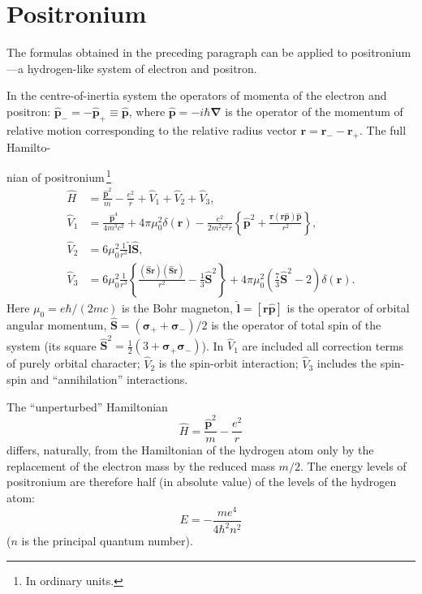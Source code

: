 \section{Positronium}

The formulas obtained in the preceding paragraph can be applied to positronium---a hydrogen-like system of electron and positron.

In the centre-of-inertia system the operators of momenta of the electron and positron: $\hat{\mathbf{p}}_- = -\hat{\mathbf{p}}_+ \equiv \hat{\mathbf{p}}$, where $\hat{\mathbf{p}} = -i\hbar\boldsymbol{\nabla}$ is the operator of the momentum of relative motion corresponding to the relative radius vector $\mathbf{r} = \mathbf{r}_- - \mathbf{r}_+$. The full Hamilto-

nian of positronium\,\footnote{In ordinary units.}
\begin{equation}
\begin{split}
\hat{H} &= \frac{\hat{\mathbf{p}}^2}{m} - \frac{e^2}{r} + \hat{V}_1 + \hat{V}_2 + \hat{V}_3,\\
\hat{V}_1 &= \frac{\hat{\mathbf{p}}^4}{4m^3c^2} + 4\pi\mu_0^2\delta(\mathbf{r}) - \frac{e^2}{2m^2c^2r}\left\{\hat{\mathbf{p}}^2+\frac{\mathbf{r}(\mathbf{r}\hat{\mathbf{p}})\hat{\mathbf{p}}}{r^2}\right\},\\
\hat{V}_2 &= 6\mu_0^2\frac{1}{r^3}\hat{\mathbf{l}}\hat{\mathbf{S}},\\
\hat{V}_3 &= 6\mu_0^2\frac{1}{r^3}\left\{\frac{(\hat{\mathbf{S}}\mathbf{r})(\hat{\mathbf{S}}\mathbf{r})}{r^2}-\frac{1}{3}\hat{\mathbf{S}}^2\right\}+4\pi\mu_0^2\left(\frac{7}{3}\hat{\mathbf{S}}^2-2\right)\delta(\mathbf{r}).
\end{split}
\tag{84.1}
\end{equation}
Here $\mu_0 = e\hbar/(2mc)$ is the Bohr magneton, $\hat{\mathbf{l}} = [\mathbf{r}\hat{\mathbf{p}}]$ is the operator of orbital angular momentum, $\hat{\mathbf{S}} = (\boldsymbol{\sigma}_+ + \boldsymbol{\sigma}_-)/2$ is the operator of total spin of the system (its square $\hat{\mathbf{S}}^2 = \frac{1}{2}(3 + \boldsymbol{\sigma}_+\boldsymbol{\sigma}_-)$). In $\hat{V}_1$ are included all correction terms of purely orbital character; $\hat{V}_2$ is the spin-orbit interaction; $\hat{V}_3$ includes the spin-spin and ``annihilation'' interactions.

The ``unperturbed'' Hamiltonian
\[
\hat{H} = \frac{\hat{\mathbf{p}}^2}{m} - \frac{e^2}{r}
\]
differs, naturally, from the Hamiltonian of the hydrogen atom only by the replacement of the electron mass by the reduced mass $m/2$. The energy levels of positronium are therefore half (in absolute value) of the levels of the hydrogen atom:
\begin{equation}
E = -\frac{me^4}{4\hbar^2 n^2}
\tag{84.2}
\end{equation}
($n$ is the principal quantum number).

